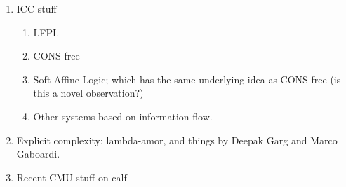 \documentclass[acmsmall,review]{acmart}
\begin{document}
\begin{enumerate}
\begin{enumerate}
  \item ICC stuff
    \begin{enumerate}
    \item LFPL
    \item CONS-free
    \item Soft Affine Logic; which has the same underlying idea as
      CONS-free (is this a novel observation?)
    \item Other systems based on information flow.
    \end{enumerate}
  \item Explicit complexity: lambda-amor, and things by Deepak Garg
    and Marco Gaboardi.
  \item Recent CMU stuff on calf
  \end{enumerate}

\end{enumerate}
\end{document}
